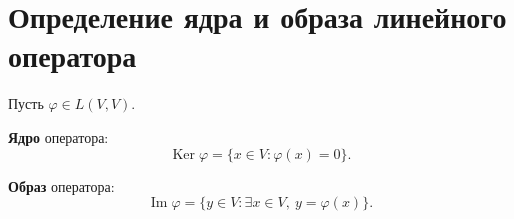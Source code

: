 \section{Определение ядра и образа линейного оператора}

\begin{definition}
Пусть $\varphi \in L(V, V)$.

\textbf{Ядро} оператора:
\[
\operatorname{Ker} \varphi = \{ x \in V : \varphi(x) = 0 \}.
\]

\textbf{Образ} оператора:
\[
\operatorname{Im} \varphi = \{ y \in V : \exists x \in V,\ y = \varphi(x) \}.
\]
\end{definition}
